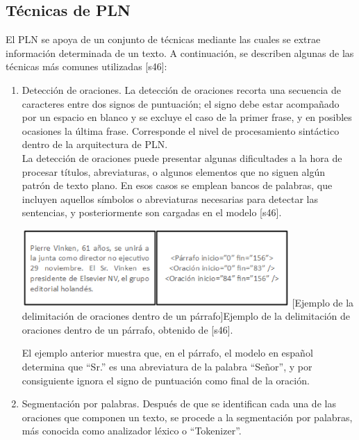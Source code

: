\subsection{Técnicas de PLN}
El PLN se apoya de un conjunto de técnicas mediante las cuales se extrae información determinada de un texto. A continuación, se describen algunas de las técnicas más comunes utilizadas [s46]:

\begin{enumerate}
    \item Detección de oraciones. La detección de oraciones recorta una secuencia de caracteres entre dos signos de puntuación; el signo debe estar acompañado por un espacio en blanco y se excluye el caso de la primer frase, y en posibles ocasiones la última frase. Corresponde el nivel de procesamiento sintáctico dentro de la arquitectura de PLN.\\
    
La detección de oraciones puede presentar algunas dificultades a la hora de procesar títulos, abreviaturas, o algunos elementos que no siguen algún patrón de texto plano. En esos casos se emplean bancos de palabras, que incluyen aquellos símbolos o abreviaturas necesarias para detectar las sentencias, y posteriormente son cargadas en el modelo [s46].
\begin{center}
    \includegraphics[width=0.8\textwidth]{Images/Cap 2/Deteccion_Oraciones.png}
    [Ejemplo de la delimitación de oraciones dentro de un párrafo]{Ejemplo de la delimitación de oraciones dentro de un párrafo, obtenido de [s46].}  %
\end{center}
El ejemplo anterior muestra que, en el párrafo, el modelo en español determina que “Sr.” es una abreviatura de la palabra “Señor”, y por consiguiente ignora el signo de puntuación como final de la oración.

\item Segmentación por palabras. Después de que se identifican cada una de las oraciones que componen un texto, se procede a la segmentación por palabras, más conocida como analizador léxico o “Tokenizer”.\\



\end{enumerate}

